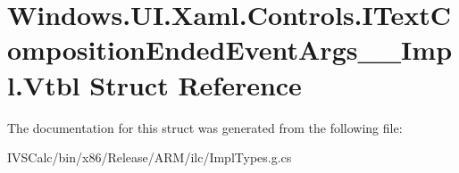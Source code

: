 \hypertarget{struct_windows_1_1_u_i_1_1_xaml_1_1_controls_1_1_i_text_composition_ended_event_args_____impl_1_1_vtbl}{}\section{Windows.\+U\+I.\+Xaml.\+Controls.\+I\+Text\+Composition\+Ended\+Event\+Args\+\_\+\+\_\+\+Impl.\+Vtbl Struct Reference}
\label{struct_windows_1_1_u_i_1_1_xaml_1_1_controls_1_1_i_text_composition_ended_event_args_____impl_1_1_vtbl}


The documentation for this struct was generated from the following file\+:\begin{DoxyCompactItemize}
\item 
I\+V\+S\+Calc/bin/x86/\+Release/\+A\+R\+M/ilc/Impl\+Types.\+g.\+cs\end{DoxyCompactItemize}
